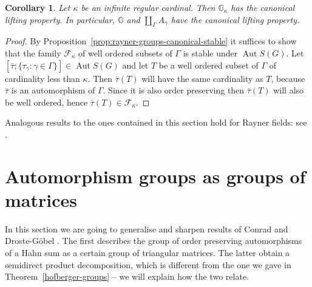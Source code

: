 \documentclass[12pt,a4paper,reqno,openright]{amsart}
\newcommand{\bbG}{{\mathbb G}}
\newcommand{\cF}{{\mathcal F}}
\renewcommand{\1}{\mathbbm{1}}
\DeclareMathOperator{\Aut}{Aut}
\newcommand{\GG}{\bbG}
\theoremstyle{definition}
\theoremstyle{plain}
\theoremstyle{plain}
\theoremstyle{plain}
\theoremstyle{plain}
\theoremstyle{plain}
\theoremstyle{plain}
\theoremstyle{plain}
\newtheorem{cor}[defn]{Corollary}
\theoremstyle{plain}
\theoremstyle{definition}
\theoremstyle{definition}
\theoremstyle{plain}
\theoremstyle{definition}
\theoremstyle{definition}
\theoremstyle{plain}
\theoremstyle{plain}
\theoremstyle{plain}
\begin{document}
\begin{cor}\label{cor:k-bdd-have-canonical-lifting}
	Let $ \kappa $ be an infinite regular cardinal. Then $ \GG_\kappa $ has the canonical lifting property. In particular, $ \GG $ and $ \coprod_\Gamma A_\gamma $ have the canonical lifting property.
\end{cor}
\begin{proof}
	By Proposition~\ref{prop:rayner-groups-canonical-stable} it suffices to show that the family $ \cF_\kappa $ of well ordered subsets of $ \Gamma $ is stable under $ \Aut S(G) $. Let $ [\bar\tau;\{ \tau_\gamma:\gamma\in\Gamma \}]\in\Aut S(G) $ and let $ T $ be a well ordered subset of $ \Gamma $ of cardinality less than $ \kappa $. Then $ \bar\tau(T) $ will have the same cardinality as $ T $, because $ \bar\tau $ is an automorphism of $ \Gamma $. Since it is also order preserving then $ \bar\tau(T) $ will also be well ordered, hence $ \bar\tau(T)\in\cF_\kappa $.
\end{proof}

Analogous results to the ones contained in this section hold for Rayner fields: see \cite[Section~3.2]{ours-fields}.



\section{Automorphism groups as groups of matrices}\label{sec:matrices}
In this section we are going to generalise and sharpen results of Conrad \cite{conrad} and Droste-G\"obel \cite{droste-goebel}. The first describes the group of order preserving automorphisms of a Hahn sum as a certain group of triangular matrices. The latter obtain a semidirect product decomposition, which is different from the one we gave in Theorem~\ref{hofberger-groups} -- we will explain how the two relate.
 
\end{document}
